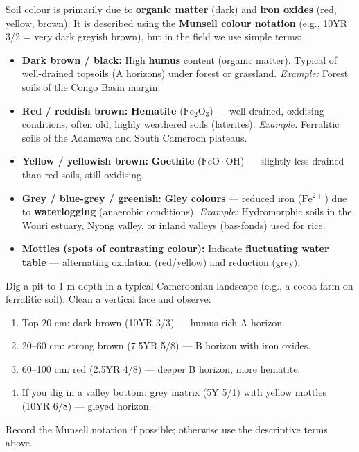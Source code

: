 \documentclass[11pt]{article}
\begin{document}
Soil colour is primarily due to \textbf{organic matter} (dark) and \textbf{iron oxides} (red, yellow, brown). It is described using the \textbf{Munsell colour notation} (e.g., 10YR 3/2 = very dark greyish brown), but in the field we use simple terms:

\begin{propriete}
\begin{itemize}
\item \textbf{Dark brown / black:} High \textbf{humus} content (organic matter). Typical of well-drained topsoils (A horizons) under forest or grassland. \emph{Example:} Forest soils of the Congo Basin margin.
\item \textbf{Red / reddish brown:} \textbf{Hematite} ($\mathrm{Fe_2O_3}$) — well-drained, oxidising conditions, often old, highly weathered soils (laterites). \emph{Example:} Ferralitic soils of the Adamawa and South Cameroon plateaus.
\item \textbf{Yellow / yellowish brown:} \textbf{Goethite} ($\mathrm{FeO\cdot OH}$) — slightly less drained than red soils, still oxidising.
\item \textbf{Grey / blue-grey / greenish:} \textbf{Gley colours} — reduced iron ($\mathrm{Fe^{2+}}$) due to \textbf{waterlogging} (anaerobic conditions). \emph{Example:} Hydromorphic soils in the Wouri estuary, Nyong valley, or inland valleys (bas-fonds) used for rice.
\item \textbf{Mottles (spots of contrasting colour):} Indicate \textbf{fluctuating water table} — alternating oxidation (red/yellow) and reduction (grey).
\end{itemize}
\end{propriete}

\begin{experience}
Dig a pit to 1 m depth in a typical Cameroonian landscape (e.g., a cocoa farm on ferralitic soil). Clean a vertical face and observe:
\begin{enumerate}
\item Top 20 cm: dark brown (10YR 3/3) — humus-rich A horizon.
\item 20–60 cm: strong brown (7.5YR 5/8) — B horizon with iron oxides.
\item 60–100 cm: red (2.5YR 4/8) — deeper B horizon, more hematite.
\item If you dig in a valley bottom: grey matrix (5Y 5/1) with yellow mottles (10YR 6/8) — gleyed horizon.
\end{enumerate}
Record the Munsell notation if possible; otherwise use the descriptive terms above.
\end{experience}
\end{document}
